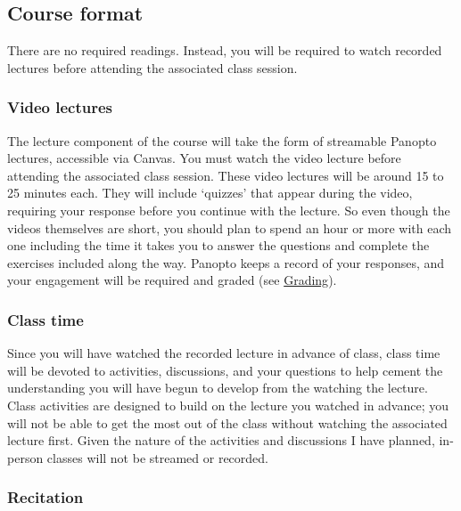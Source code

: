 \documentclass[
  letterpaper,
  DIV=11,
  numbers=noendperiod]{scrartcl}
\begin{document}
\hypertarget{course-format}{%
\subsection{Course format}\label{course-format}}

There are no required readings. Instead, you will be required to watch
recorded lectures before attending the associated class session.

\hypertarget{video-lectures}{%
\subsubsection{Video lectures}\label{video-lectures}}

The lecture component of the course will take the form of streamable
Panopto lectures, accessible via Canvas. You must watch the video
lecture before attending the associated class session. These video
lectures will be around 15 to 25 minutes each. They will include
`quizzes' that appear during the video, requiring your response before
you continue with the lecture. So even though the videos themselves are
short, you should plan to spend an hour or more with each one including
the time it takes you to answer the questions and complete the exercises
included along the way. Panopto keeps a record of your responses, and
your engagement will be required and graded (see
\protect\hyperlink{grading}{Grading}).

\hypertarget{class-time}{%
\subsubsection{Class time}\label{class-time}}

Since you will have watched the recorded lecture in advance of class,
class time will be devoted to activities, discussions, and your
questions to help cement the understanding you will have begun to
develop from the watching the lecture. Class activities are designed to
build on the lecture you watched in advance; you will not be able to get
the most out of the class without watching the associated lecture first.
Given the nature of the activities and discussions I have planned,
in-person classes will not be streamed or recorded.

\hypertarget{recitation}{%
\subsubsection{Recitation}\label{recitation}}
\end{document}
